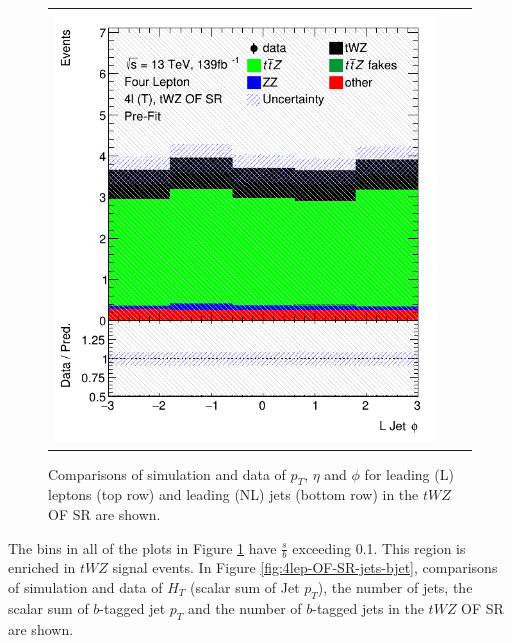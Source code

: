 \begin{figure}[htbp]
\begin{tabular}{ccc}
    \includegraphics[width=.25\textwidth]{figures/PreFitPlots/lep4_tWZ_4T_OF_LJet_phi.png} \\

  \end{tabular}
    \caption{Comparisons of simulation and data of $p_{T}$, $\eta$ and $\phi$ for leading (L) leptons (top row) and leading (NL) jets (bottom row) in the $tWZ$ OF SR are shown.}\label{fig:4lep-OF-SR-leptonPlots}
\end{figure}The bins in all of the plots in Figure \ref{fig:4lep-OF-SR-leptonPlots} have $\frac{s}{b}$ exceeding 0.1. This region is enriched in $tWZ$ signal events. In Figure \ref{fig:4lep-OF-SR-jets-bjet}, comparisons of simulation and data of $H_{T}$ (scalar sum of Jet $p_{T}$), the number of jets, the scalar sum of $b$-tagged jet $p_{T}$ and the number of $b$-tagged jets in the $tWZ$ OF SR are shown.
